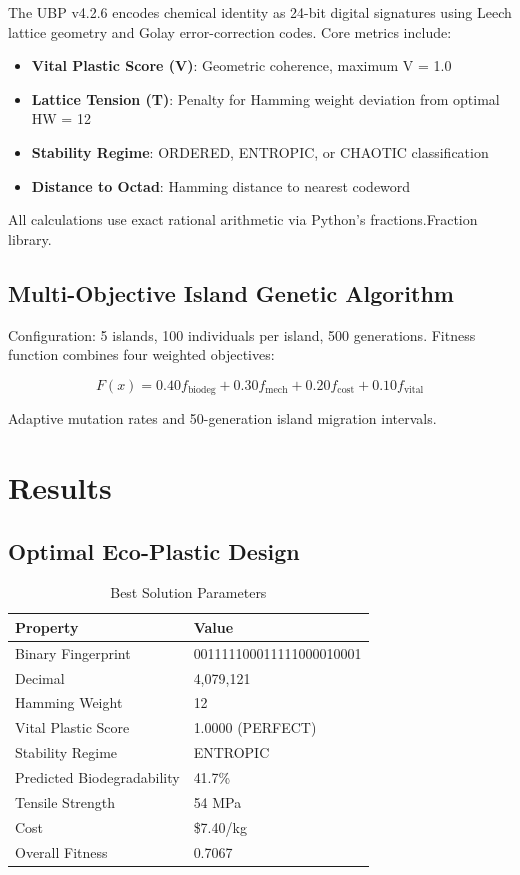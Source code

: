 \documentclass[11pt]{article}
\begin{document}
The UBP v4.2.6 encodes chemical identity as 24-bit digital signatures using Leech lattice geometry and Golay error-correction codes. Core metrics include:

\begin{itemize}
    \item \textbf{Vital Plastic Score (V)}: Geometric coherence, maximum V = 1.0
    \item \textbf{Lattice Tension (T)}: Penalty for Hamming weight deviation from optimal HW = 12
    \item \textbf{Stability Regime}: ORDERED, ENTROPIC, or CHAOTIC classification
    \item \textbf{Distance to Octad}: Hamming distance to nearest codeword
\end{itemize}

All calculations use exact rational arithmetic via Python's fractions.Fraction library.

\subsection{Multi-Objective Island Genetic Algorithm}

Configuration: 5 islands, 100 individuals per island, 500 generations. Fitness function combines four weighted objectives:

\begin{equation}
F(x) = 0.40 f_{\text{biodeg}} + 0.30 f_{\text{mech}} + 0.20 f_{\text{cost}} + 0.10 f_{\text{vital}}
\end{equation}

Adaptive mutation rates and 50-generation island migration intervals.

\section{Results}

\subsection{Optimal Eco-Plastic Design}

\begin{table}[h]
\centering
\caption{Best Solution Parameters}
\begin{tabular}{ll}
\toprule
\textbf{Property} & \textbf{Value} \\
\midrule
Binary Fingerprint & 001111100011111000010001 \\
Decimal & 4,079,121 \\
Hamming Weight & 12 \\
Vital Plastic Score & 1.0000 (PERFECT) \\
Stability Regime & ENTROPIC \\
Predicted Biodegradability & 41.7\% \\
Tensile Strength & 54 MPa \\
Cost & \$7.40/kg \\
Overall Fitness & 0.7067 \\
\bottomrule
\end{tabular}
\end{table}
\end{document}
